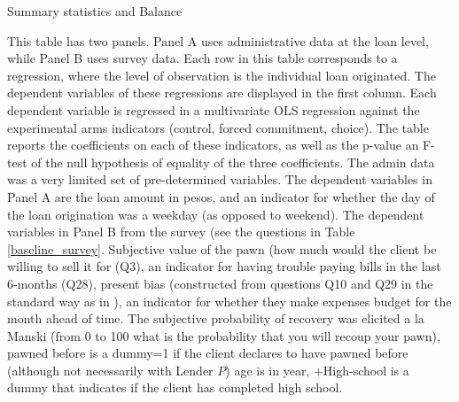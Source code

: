 \documentclass[11pt, a4paper]{article}
\begin{document}
\begin{table}[!h]
\caption{Summary statistics and Balance}
\label{SS}
\begin{center}
\resizebox{0.65\textwidth}{!}{
\scriptsize{}
}
\end{center}
\scriptsize {This table has two panels. Panel A uses administrative data at the loan level, while Panel B uses survey data. Each row in this table corresponds to a regression, where the level of observation is the individual loan originated. The dependent variables of these regressions are displayed in the first column. Each dependent variable is regressed in a multivariate OLS regression against the experimental arms indicators (control, forced commitment, choice). The table reports the coefficients on each of these indicators, as well as the p-value an F-test of the null hypothesis of equality of the three coefficients. The admin data was a very limited set of pre-determined variables. The dependent variables in Panel A are the loan amount in pesos, and an indicator for whether the day of the loan origination was a weekday (as opposed to weekend). The dependent variables in Panel B from the survey (see the questions in Table \ref{baseline_survey}. Subjective value of the pawn (how much would the client be willing to sell it for (Q3), an indicator for having trouble paying bills in the last 6-months (Q28), present bias (constructed from questions Q10 and Q29 in the standard way as in \cite{Ashraf}), an indicator for whether they make expenses budget for the month ahead of time. The subjective probability of recovery was elicited a la Manski (from 0 to 100 what is the probability that you will recoup your pawn), pawned before is a dummy=1 if the client declares to have pawned before (although not necessarily with Lender $P$) age is in year, +High-school is a dummy that indicates if the client has completed high school. 
}
\end{table}


\end{document}
